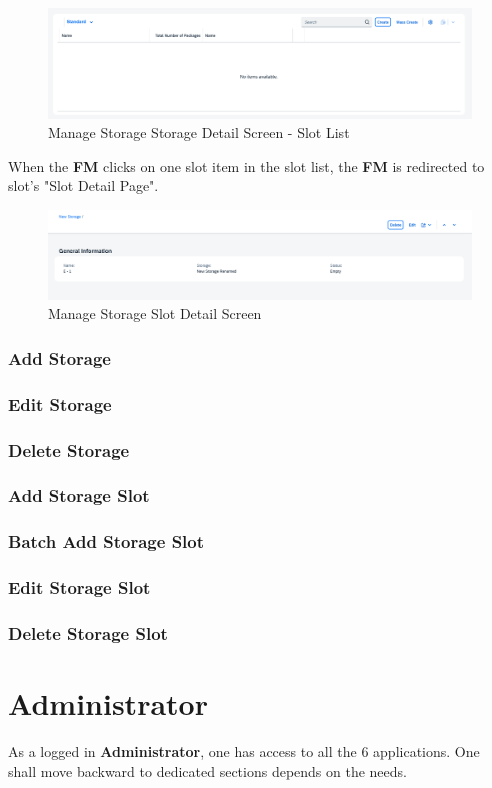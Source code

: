 \begin{figure}[H] %
	\centering
	\includegraphics[width=1\linewidth]{images/user_doc/storage/StorageObjectPage/slotList.png}
	\caption{Manage Storage Storage Detail Screen - Slot List}
	\label{fig:MSstorageObjSlotList}
\end{figure}

\bigskip

When the \textbf{FM} clicks on one slot item in the slot list, the \textbf{FM} is redirected to slot's "Slot Detail Page".

\begin{figure}[H] %
	\centering
	\includegraphics[width=1\linewidth]{images/user_doc/storage/SlotObjectPage/slotObjOverview.png}
	\caption{Manage Storage Slot Detail Screen}
	\label{fig:MSslotObjOverview}
\end{figure}

\subsubsection{Add Storage}
\subsubsection{Edit Storage}
\subsubsection{Delete Storage}

\subsubsection{Add Storage Slot}
\subsubsection{Batch Add Storage Slot}
\subsubsection{Edit Storage Slot}
\subsubsection{Delete Storage Slot}

\pagebreak

\section{Administrator}
As a logged in \textbf{Administrator}, one has access to all the 6 applications. One shall move backward to dedicated sections depends on the needs. 